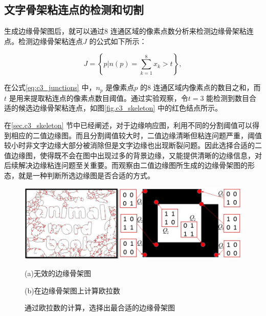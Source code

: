         \subsection{文字骨架粘连点的检测和切割}
        \label{sec.c3_skeleton_cut}

        生成边缘骨架图后，就可以通过8 连通区域的像素点数分析来检测边缘骨架粘连点。检测边缘骨架粘连点$J$ 的公式如下所示：

        \begin{equation}
        J=\left\{ p|n(p)=\sum_{k=1}^8x_k>t \right\},
        \label{eq:c3_junctions}
        \end{equation}

        在公式\ref{eq:c3_junctions} 中，$n_p$ 是像素点$p$ 的8 连通区域内像素点的数目之和，而$t$ 是用来提取粘连点的像素点数目阈值。通过实验观察，令$t = 3$ 能检测到数目合适的候选边缘骨架粘连点，如图\ref{fig.c3_skeleton} 中的红色结点所示。

        在\ref{sec.c3_skeleton} 节中已经阐述，对于边缘响应图，利用不同的分割阈值可以得到相应的二值边缘图。而且分割阈值较大时，二值边缘清晰但粘连问题严重，阈值较小时非文字边缘大部分被消除但是文字边缘也出现断裂问题。因此选择合适的二值边缘图，使得既不会在图中出现过多的背景边缘，又能提供清晰的边缘信息，对后续解决边缘粘连问题至关重要。而观察由二值边缘图所生成的边缘骨架图的形态，就是一种判断所选边缘图是否合适的方式。

        \begin{figure}[!h]
        \centering
        \includegraphics[width=\textwidth]{./figures/c3_select_skeleton.jpg}
        \begin{minipage}[t]{0.48\linewidth}
        \centerline{\small (a)无效的边缘骨架图}
        \end{minipage}
        \begin{minipage}[t]{0.48\linewidth}
        \centerline{\small (b)在边缘骨架图上计算欧拉数}
        \end{minipage}
        \caption{通过欧拉数的计算，选择出最合适的边缘骨架图}
        \label{fig.c3_select_skeleton}
        \end{figure}

